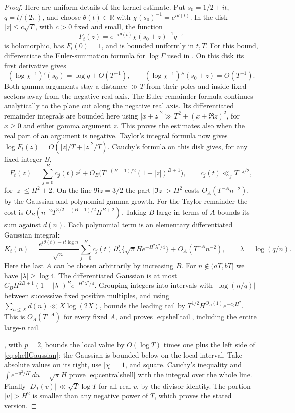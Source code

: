 \begin{proof}
Here are uniform details of the kernel estimate. Put $s_0=1/2+it$,
$q=t/(2\pi)$, and choose $\theta(t)\in\mathbb R$ with
$\chi(s_0)^{-1}=e^{i\theta(t)}$. In the disk $|z|\le c\sqrt T$,
with $c>0$ fixed and small, the function
\[
 F_t(z)=e^{-i\theta(t)}\chi(s_0+z)^{-1}q^{-z}
\]
is holomorphic, has $F_t(0)=1$, and is bounded uniformly in $t,T$.
For this bound, differentiate
the Euler-summation formula for $\log\Gamma$ used in
\cite[Appendix~\ref*{six-app:localzeta}]{Weighted}. On this disk its first derivative gives
\[
 (\log\chi^{-1})'(s_0)=\log q+O(T^{-1}),\qquad
 (\log\chi^{-1})''(s_0+z)=O(T^{-1}).
\]
Both gamma arguments stay a distance $\gg T$ from their poles and
inside fixed sectors away from the negative real axis. The Euler remainder formula continues analytically to the plane cut
along the negative real axis. Its differentiated remainder integrals
are bounded here using $|x+z|^2\gg T^2+(x+\Re z)^2$,
for $x\ge0$ and either gamma argument $z$. This proves the estimates
also when the real part of an argument is negative. Taylor's integral formula now gives
$\log F_t(z)=O(|z|/T+|z|^2/T)$.
Cauchy's formula on this disk gives, for any fixed integer $B$,
\[
 F_t(z)=\sum_{j=0}^{B}c_j(t)z^j+
 O_B\bigl(T^{-(B+1)/2}(1+|z|)^{B+1}\bigr),
 \qquad c_j(t)\ll_j T^{-j/2},
\]
for $|z|\le H^2+2$.
On the line $\Re z=3/2$ the part $|\Im z|>H^2$ costs
$O_A(T^{-A}n^{-2})$, by the Gaussian and polynomial gamma growth.
For the Taylor remainder the cost is
$O_B(n^{-2}T^{3/2-(B+1)/2}H^{B+2})$.
Taking $B$ large in terms of $A$ bounds its sum against $d(n)$.
Each polynomial term is an elementary differentiated Gaussian integral:
\[
 K_t(n)=\frac{e^{i\theta(t)-it\log n}}{\sqrt n}
 \sum_{j=0}^{B}c_j(t)\,\partial_\lambda^j
       \{\sqrt\pi H e^{-H^2\lambda^2/4}\}
       +O_A(T^{-A}n^{-2}),
 \qquad \lambda=\log(q/n).
\]
Here the last $A$ can be chosen arbitrarily by increasing $B$.
For $n\notin(aT,bT]$ we have $|\lambda|\ge\log4$.
The differentiated Gaussian is at most
$C_B H^{2B+1}(1+|\lambda|)^B e^{-H^2\lambda^2/4}$.
Grouping integers into intervals with $|\log(n/q)|$ between
successive fixed positive multiples, and using
$\sum_{n\le X}d(n)\ll X\log(2X)$, bounds the leading tail by
$T^{1/2}H^{O_B(1)}e^{-c_0H^2}$.
This is $O_A(T^{-A})$ for every fixed $A$, and proves
\eqref{eq:shelltail}, including the entire large-$n$ tail.

\cite[Proposition~\ref*{six-prop:localzetaproof}]{Weighted}, with $p=2$, bounds the local
value by $O(\log T)$ times one plus the left side of
\eqref{eq:shellGaussian}; the Gaussian is bounded below on the
local interval. Take absolute values on its right, use $|\chi|=1$,
and square. Cauchy's inequality and
$\int e^{-u^2/H^2}du=\sqrt\pi H$ prove \eqref{eq:centralshell}
with the integral over the whole line. Finally
$|D_T(v)|\ll\sqrt T\log T$ for all real $v$, by the divisor identity.
The portion $|u|>H^2$ is smaller than any negative power of $T$,
which proves the stated version.
\end{proof}

